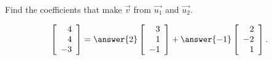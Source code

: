 \documentclass{ximera}
\author{Zack Reed}
\begin{document}
\begin{exercise}
  Find the coefficients that make $\vec{v}$ from $\vec{u_1}$ and $\vec{u_2}$.
  
  \begin{equation*}
    \startmat{r}
      4 \\
      4 \\
      -3
    \stopmat
    =
    \answer{2}
    \startmat{r}
      3 \\
      1 \\
      -1
    \stopmat
    + \answer{-1}
    \startmat{r}
      2 \\
      -2 \\
      1
    \stopmat.
  \end{equation*}
  
\end{exercise}
\end{document}
